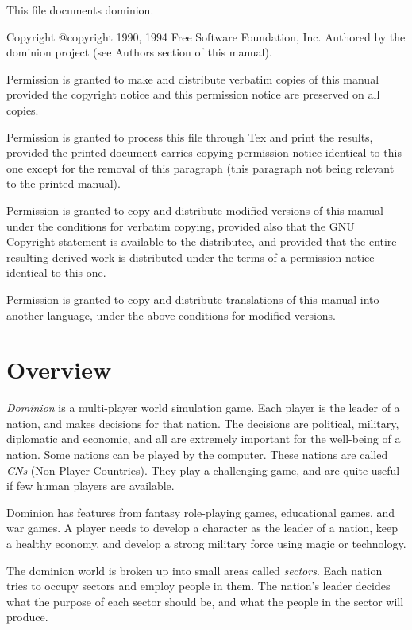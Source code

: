 \begin{ifinfo}
This file documents dominion.

Copyright @copyright{} 1990, 1994 Free Software Foundation, Inc.
Authored by the dominion project (see Authors section of this manual).

Permission is granted to make and distribute verbatim copies of this manual
provided the copyright notice and this permission notice are preserved on
all copies.
\begin{ignore}
Permission is granted to process this file through Tex and print the
results, provided the printed document carries copying permission notice
identical to this one except for the removal of this paragraph (this
paragraph not being relevant to the printed manual).
\end{ignore}
Permission is granted to copy and distribute modified versions of this
manual under the conditions for verbatim copying, provided also that the
GNU Copyright statement is available to the distributee, and provided that
the entire resulting derived work is distributed under the terms of a
permission notice identical to this one.

Permission is granted to copy and distribute translations of this manual
into another language, under the above conditions for modified versions.
\end{ifinfo}

\clearpage
{}

\chapter{Overview}

{\em Dominion} is a multi-player world simulation game.  Each player
is the leader of a nation, and makes decisions for that nation.  The
decisions are political, military, diplomatic and economic, and all
are extremely important for the well-being of a nation.  Some nations
can be played by the computer.  These nations are called {\em CNs}
(Non Player Countries).  They play a challenging game, and are quite
useful if few human players are available.

Dominion has features from fantasy role-playing games, educational
games, and war games. A player needs to develop a character as the
leader of a nation, keep a healthy economy, and develop a strong
military force using magic or technology.

The dominion world is broken up into small areas called {\em sectors}.
Each nation tries to occupy sectors and employ people in them.
The nation's leader decides what the purpose of each sector should be,
and what the people in the sector will produce.

